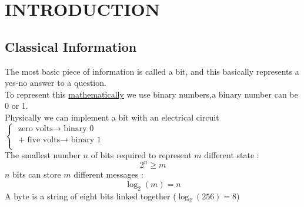\documentclass[12pt,oneside]{book}
\begin{document}


\chapter{INTRODUCTION}
\section{Classical Information}
The most basic piece of information is called a bit, and this basically represents a yes-no answer to a question.\\
To represent this \underline{mathematically} we use binary numbers,a binary number can be 0 or 1.\\
Physically we can implement a bit with an electrical circuit $\begin{cases}
        \text{ zero volts} \to \text{ binary 0}   \\
        \text{ + five volts} \to \text{ binary 1} \\
    \end{cases}$\\
The smallest number $n$ of bits required to represent $m$ different state :
\[ 2^n \geq m \]
$n$ bits can store $m$ different messages :
\[\log_2 (m) = n\]
A byte is a string of eight bits linked together ($\log_2 (256) = 8 $)
\end{document}

